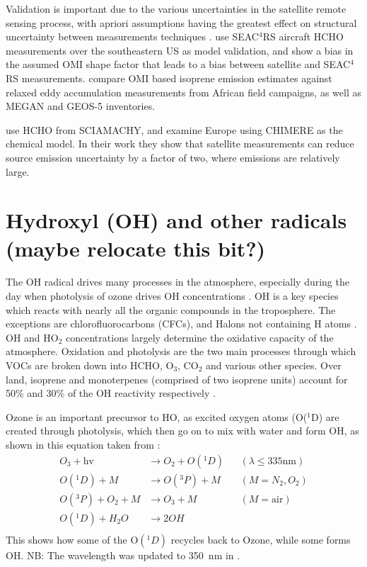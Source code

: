 	    Validation is important due to the various uncertainties in the satellite remote sensing process, with apriori assumptions having the greatest effect on structural uncertainty between measurements techniques \citet{Lorente2017}.
	    \cite{Zhu2016} use SEAC$^4$RS aircraft HCHO measurements over the southeastern US as model validation, and show a bias in the assumed OMI shape factor that leads to a bias between satellite and SEAC$^4$RS measurements.
	    \cite{Marais2014} compare OMI based isoprene emission estimates against relaxed eddy accumulation measurements from African field campaigns, as well as MEGAN and GEOS-5 inventories.
	    
	    \citet{Dufour2009} use HCHO from SCIAMACHY, and examine Europe using CHIMERE as the chemical model. 
	    In their work they show that satellite measurements can reduce source emission uncertainty by a factor of two, where emissions are relatively large.  
  
  
\section{Hydroxyl (OH) and other radicals (maybe relocate this bit?)}
    The OH radical drives many processes in the atmosphere, especially during the day when photolysis of ozone drives OH concentrations \citep{Atkinson2000}.    
    OH is a key species which reacts with nearly all the organic compounds in the troposphere.
    The exceptions are chlorofluorocarbons (CFCs), and Halons not containing H atoms \citep{Atkinson2000}.
    OH and HO$_2$ concentrations largely determine the oxidative capacity of the atmosphere.
    Oxidation and photolysis are the two main processes through which VOCs are broken down into HCHO, O$_3$, CO$_2$ and various other species.
    Over land, isoprene and monoterpenes (comprised of two isoprene units) account for 50\% and 30\% of the OH reactivity respectively \citep{Fuentes2000}.
    
    Ozone is an important precursor to HO, as excited oxygen atoms (O(${}^1$D) are created through photolysis, which then go on to mix with water and form OH, as shown in this equation taken from \citet{Atkinson2000}:
    \begin{align*}
      O_3 + \text{hv}         & \to  O_2 + O({}^1D)   && (\lambda \le 335 \text{nm}) \\%
      O({}^1D) + M            & \to  O({}^3P) + M     && (M=N_2, O_2)               \\%
      O({}^3P) + O_2 + M      & \to  O_3 + M          && (M=\text{air})             \\%
      O({}^1D) + H_2O         & \to  2OH              &&                            \\%
    \end{align*}
    This shows how some of the O$({}^1D)$ recycles back to Ozone, while some forms OH.
    NB: The wavelength was updated to 350~nm in \citet{AtkinsonArey2003}.
    
